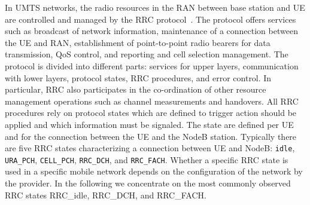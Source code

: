 In UMTS networks, the radio resources in the RAN between base station and UE are controlled and managed by the \gls{RRC} protocol~\cite{3GPP_RRC_Spec}.
The protocol offers services such as broadcast of network information, maintenance of a connection between the \gls{UE} and \gls{RAN}, establishment of point-to-point radio bearers for data transmission, \gls{QoS} control, and reporting and cell selection management.
The protocol is divided into different parts: services for upper layers, communication with lower layers, protocol states, \gls{RRC} procedures, and error control.
In particular, \gls{RRC} also participates in the co-ordination of other resource management operations such as channel measurements and handovers.
All \gls{RRC} procedures rely on protocol states which are defined to trigger action should be applied and which information must be signaled. 
The state are defined per \gls{UE} and for the connection between the \gls{UE} and the \gls{NodeB} station.
Typically there are five \gls{RRC} states characterizing a connection between \gls{UE} and \gls{NodeB}: \texttt{idle}, \texttt{URA\_PCH}, \texttt{CELL\_PCH}, \texttt{RRC\_DCH}, and \texttt{RRC\_FACH}.
Whether a specific \gls{RRC} state is used in a specific mobile network depends on the configuration of the network by the provider.
In the following we concentrate on the most commonly observed~\cite{Qian2010a} \gls{RRC} states \gls{RRC_idle}, \gls{RRC_DCH}, and \gls{RRC_FACH}.

